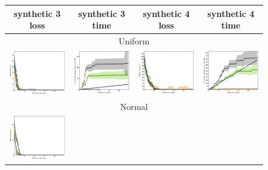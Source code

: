 \documentclass{article}
\renewcommand\[{\begin{equation}}
\renewcommand\]{\end{equation}}
\begin{document}
\begin{figure}[b]
    \centering
    {\footnotesize
    \begin{tabular}{cccc}
        \hline
        {\sc synthetic 3 loss} & {\sc synthetic 3 time} & {\sc synthetic 4 loss} & {\sc synthetic 4 time}
        \\
        \hline \hline
        \multicolumn{4}{c}{{\sc Uniform}}
        \\
        \includegraphics[width=10em]{figures/synthetic_vs_others_3_uniform_per_iter_loss} &
        \includegraphics[width=10em]{figures/synthetic_vs_others_3_uniform_per_iter_time} &
        \includegraphics[width=10em]{figures/synthetic_vs_others_4_uniform_per_iter_loss} &
        \includegraphics[width=10em]{figures/synthetic_vs_others_4_uniform_per_iter_time}
        \\
        \hline
        \multicolumn{4}{c}{{\sc Normal}}
        \\
        \includegraphics[width=10em]{figures/synthetic_vs_others_3_normal_per_iter_loss} &

\end{tabular}}
\end{figure}
\end{document}

